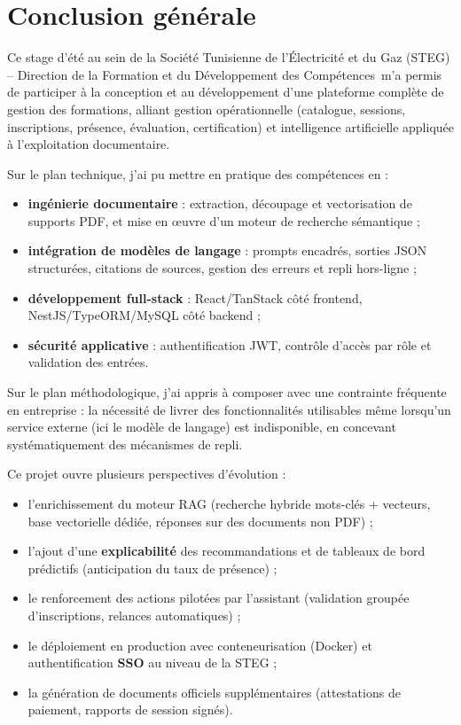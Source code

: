 \documentclass[12pt,a4paper]{report}
\newcommand{\organisme}{Société Tunisienne de l'Électricité et du Gaz (STEG) -- Direction de la Formation et du Développement des Compétences}
\begin{document}
\chapter*{Conclusion générale}

Ce stage d'été au sein de la \organisme\ m'a permis de participer à la conception et au développement d'une plateforme complète de gestion des formations, alliant gestion opérationnelle (catalogue, sessions, inscriptions, présence, évaluation, certification) et intelligence artificielle appliquée à l'exploitation documentaire.

Sur le plan technique, j'ai pu mettre en pratique des compétences en :
\begin{itemize}
    \item \textbf{ingénierie documentaire} : extraction, découpage et vectorisation de supports PDF, et mise en œuvre d'un moteur de recherche sémantique ;
    \item \textbf{intégration de modèles de langage} : prompts encadrés, sorties JSON structurées, citations de sources, gestion des erreurs et repli hors-ligne ;
    \item \textbf{développement full-stack} : React/TanStack côté frontend, NestJS/TypeORM/MySQL côté backend ;
    \item \textbf{sécurité applicative} : authentification JWT, contrôle d'accès par rôle et validation des entrées.
\end{itemize}

Sur le plan méthodologique, j'ai appris à composer avec une contrainte fréquente en entreprise : la nécessité de livrer des fonctionnalités utilisables même lorsqu'un service externe (ici le modèle de langage) est indisponible, en concevant systématiquement des mécanismes de repli.

Ce projet ouvre plusieurs perspectives d'évolution :
\begin{itemize}
    \item l'enrichissement du moteur RAG (recherche hybride mots-clés + vecteurs, base vectorielle dédiée, réponses sur des documents non PDF) ;
    \item l'ajout d'une \textbf{explicabilité} des recommandations et de tableaux de bord prédictifs (anticipation du taux de présence) ;
    \item le renforcement des actions pilotées par l'assistant (validation groupée d'inscriptions, relances automatiques) ;
    \item le déploiement en production avec conteneurisation (Docker) et authentification \textbf{SSO} au niveau de la STEG ;
    \item la génération de documents officiels supplémentaires (attestations de paiement, rapports de session signés).
\end{itemize}
\end{document}
